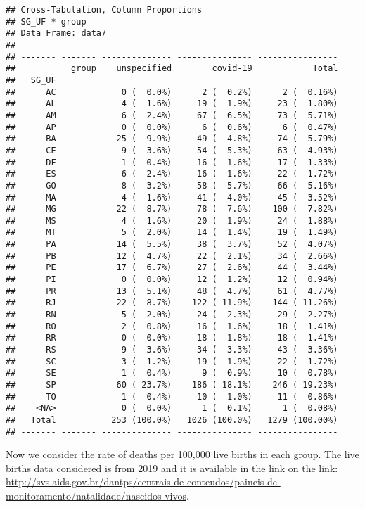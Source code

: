 \documentclass[
]{article}
\begin{document}
\begin{verbatim}
## Cross-Tabulation, Column Proportions  
## SG_UF * group  
## Data Frame: data7  
## 
## ------- ------- -------------- --------------- ----------------
##           group    unspecified        covid-19            Total
##   SG_UF                                                        
##      AC             0 (  0.0%)      2 (  0.2%)      2 (  0.16%)
##      AL             4 (  1.6%)     19 (  1.9%)     23 (  1.80%)
##      AM             6 (  2.4%)     67 (  6.5%)     73 (  5.71%)
##      AP             0 (  0.0%)      6 (  0.6%)      6 (  0.47%)
##      BA            25 (  9.9%)     49 (  4.8%)     74 (  5.79%)
##      CE             9 (  3.6%)     54 (  5.3%)     63 (  4.93%)
##      DF             1 (  0.4%)     16 (  1.6%)     17 (  1.33%)
##      ES             6 (  2.4%)     16 (  1.6%)     22 (  1.72%)
##      GO             8 (  3.2%)     58 (  5.7%)     66 (  5.16%)
##      MA             4 (  1.6%)     41 (  4.0%)     45 (  3.52%)
##      MG            22 (  8.7%)     78 (  7.6%)    100 (  7.82%)
##      MS             4 (  1.6%)     20 (  1.9%)     24 (  1.88%)
##      MT             5 (  2.0%)     14 (  1.4%)     19 (  1.49%)
##      PA            14 (  5.5%)     38 (  3.7%)     52 (  4.07%)
##      PB            12 (  4.7%)     22 (  2.1%)     34 (  2.66%)
##      PE            17 (  6.7%)     27 (  2.6%)     44 (  3.44%)
##      PI             0 (  0.0%)     12 (  1.2%)     12 (  0.94%)
##      PR            13 (  5.1%)     48 (  4.7%)     61 (  4.77%)
##      RJ            22 (  8.7%)    122 ( 11.9%)    144 ( 11.26%)
##      RN             5 (  2.0%)     24 (  2.3%)     29 (  2.27%)
##      RO             2 (  0.8%)     16 (  1.6%)     18 (  1.41%)
##      RR             0 (  0.0%)     18 (  1.8%)     18 (  1.41%)
##      RS             9 (  3.6%)     34 (  3.3%)     43 (  3.36%)
##      SC             3 (  1.2%)     19 (  1.9%)     22 (  1.72%)
##      SE             1 (  0.4%)      9 (  0.9%)     10 (  0.78%)
##      SP            60 ( 23.7%)    186 ( 18.1%)    246 ( 19.23%)
##      TO             1 (  0.4%)     10 (  1.0%)     11 (  0.86%)
##    <NA>             0 (  0.0%)      1 (  0.1%)      1 (  0.08%)
##   Total           253 (100.0%)   1026 (100.0%)   1279 (100.00%)
## ------- ------- -------------- --------------- ----------------
\end{verbatim}

Now we consider the rate of deaths per 100,000 live births in each
group. The live births data considered is from 2019 and it is available
in the link on the link:
\url{http://svs.aids.gov.br/dantps/centrais-de-conteudos/paineis-de-monitoramento/natalidade/nascidos-vivos}.
\end{document}
